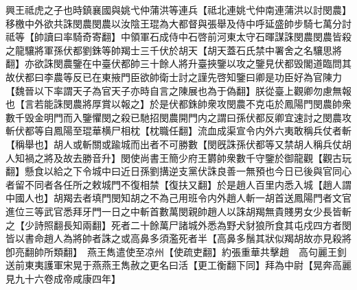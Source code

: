 興王祗虎之子也時鎮襄國與姚弋仲蒲洪等連兵【祗北連姚弋仲南連蒲洪以討閔農】移檄中外欲共誅閔農閔農以汝陰王琨為大都督與張舉及侍中呼延盛帥步騎七萬分討祗等【帥讀曰率騎奇寄翻】中領軍石成侍中石啓前河東太守石暉謀誅閔農閔農皆殺之龍驤將軍孫伏都劉銖等帥羯士三千伏於胡天【胡天蓋石氏禁中署舍之名驤思將翻】亦欲誅閔農鑒在中臺伏都帥三十餘人將升臺挾鑒以攻之鑒見伏都毁閣道臨問其故伏都曰李農等反已在東掖門臣欲帥衛士討之謹先啓知鑒曰卿是功臣好為官陳力【魏晉以下率謂天子為官天子亦時自言之陳展也為于偽翻】朕從臺上觀卿勿慮無報也【言若能誅閔農將厚賞以報之】於是伏都銖帥衆攻閔農不克屯於鳳陽門閔農帥衆數千毁金明門而入鑒懼閔之殺已馳招閔農開門内之謂曰孫伏都反卿宜速討之閔農攻斬伏都等自鳳陽至琨華横尸相枕【枕職任翻】流血成渠宣令内外六夷敢稱兵仗者斬【稱舉也】胡人或斬關或踰城而出者不可勝數【閔旣誅孫伏都等又禁胡人稱兵仗胡人知禍之將及故去勝音升】閔使尚書王簡少府王欝帥衆數千守鑒於御龍觀【觀古玩翻】懸食以給之下令城中曰近日孫劉搆逆支黨伏誅良善一無預也今日已後與官同心者留不同者各任所之敕城門不復相禁【復扶又翻】於是趙人百里内悉入城【趙人謂中國人也】胡羯去者填門閔知胡之不為己用班令内外趙人斬一胡首送鳳陽門者文官進位三等武官悉拜牙門一日之中斬首數萬閔親帥趙人以誅胡羯無貴賤男女少長皆斬之【少詩照翻長知兩翻】死者二十餘萬尸諸城外悉為野犬豺狼所食其屯戍四方者閔皆以書命趙人為將帥者誅之或高鼻多須濫死者半【高鼻多鬚其狀似羯胡故亦見殺將卽亮翻帥所類翻】　燕王雋遣使至凉州【使疏吏翻】約張重華共擊趙　高句麗王釗送前東夷護軍宋晃于燕燕王雋赦之更名曰活【更工衡翻下同】拜為中尉【晃奔高麗見九十六卷成帝咸康四年】

